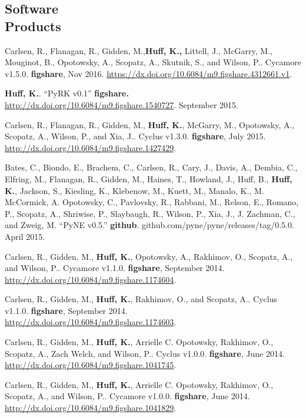 \documentclass[margin,line]{resume}
\begin{document}
\begin{resume}
    \section{\mysidestyle Software\\Products}
    \begin{bibenum}
    \item Carlsen, R., Flanagan, R., Gidden, M.,\textbf{Huff, K.,} Littell, J.,
            McGarry, M., Mouginot, B., Opotowsky, A., Scopatz, A., Skutnik, S.,
            and Wilson, P.. Cycamore v1.5.0. \textbf{figshare}, Nov 2016.
            \url{https://dx.doi.org/10.6084/m9.figshare.4312661.v1}.
    \item \textbf{Huff, K.}. ``PyRK v0.1'' \textbf{figshare.}
            \url{http://dx.doi.org/10.6084/m9.figshare.1540727}. September 2015.
    \item Carlsen, R., Flanagan, R., Gidden, M., \textbf{Huff, K.}, McGarry,
            M., Opotowsky, A., Scopatz, A., Wilson, P., and Xia, J.. Cyclus
            v1.3.0. \textbf{figshare}, July 2015.
            \url{http://dx.doi.org/10.6084/m9.figshare.1427429}.
      \item Bates, C., Biondo, E., Brachem, C., Carlsen, R., Cary, J., Davis, A., Dembia, C., Elfring, M., Flanagan, R., Gidden, M., Haines, T., Howland, J., Huff, B., \textbf{Huff, K.}, Jackson, S., Kiesling, K., Klebenow, M., Kuett, M., Manalo, K., M. McCormick, A. Opotowsky, C., Pavlovsky, R., Rabbani, M., Relson, E., Romano, P., Scopatz, A., Shriwise, P., Slaybaugh, R., Wilson, P., Xia, J., J. Zachman, C., and Zweig, M. ``PyNE v0.5.'' \textbf{github}.  github.com/pyne/pyne/releases/tag/0.5.0. April 2015.
      \item Carlsen, R., Gidden, M., \textbf{Huff, K.}, Opotowsky, A.,
      Rakhimov, O., Scopatz, A., and Wilson, P.. Cycamore v1.1.0.
      \textbf{figshare}, September 2014.
            \url{http://dx.doi.org/10.6084/m9.figshare.1174604}.
      \item Carlsen, R., Gidden, M., \textbf{Huff, K.}, Rakhimov, O., and
              Scopatz, A.. Cyclus v1.1.0. \textbf{figshare}, September 2014.
              \url{http://dx.doi.org/10.6084/m9.figshare.1174603}.
      \item Carlsen, R., Gidden, M., \textbf{Huff, K.}, Arrielle C. Opotowsky,
              Rakhimov, O., Scopatz, A., Zach Welch, and Wilson, P.. Cyclus
              v1.0.0. \textbf{figshare}, June 2014.
              \url{http://dx.doi.org/10.6084/m9.figshare.1041745}.
      \item Carlsen, R., Gidden, M., \textbf{Huff, K.}, Arrielle C. Opotowsky,
              Rakhimov, O., Scopatz, A., and Wilson, P.. Cycamore v1.0.0.
              \textbf{figshare}, June 2014.
              \url{http://dx.doi.org/10.6084/m9.figshare.1041829}.
    \end{bibenum}


\end{resume}
\end{document}
